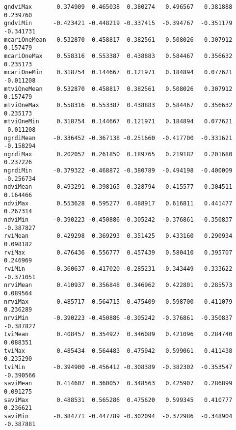 \documentclass[11pt]{article}
\begin{document}
\begin{Verbatim}[commandchars=\\\{\}]
gndviMax       0.374909  0.465038  0.380274   0.496567   0.381888  0.239760
gndviMin      -0.423421 -0.448219 -0.337415  -0.394767  -0.351179 -0.341731
mcariOneMean   0.532870  0.458817  0.382561   0.508026   0.307912  0.157479
mcariOneMax    0.558316  0.553387  0.438883   0.584467   0.356632  0.235173
mcariOneMin    0.318754  0.144667  0.121971   0.184894   0.077621 -0.011208
mtviOneMean    0.532870  0.458817  0.382561   0.508026   0.307912  0.157479
mtviOneMax     0.558316  0.553387  0.438883   0.584467   0.356632  0.235173
mtviOneMin     0.318754  0.144667  0.121971   0.184894   0.077621 -0.011208
ngrdiMean     -0.336452 -0.367138 -0.251660  -0.417700  -0.331621 -0.158294
ngrdiMax       0.202052  0.261850  0.189765   0.219182   0.201680  0.237226
ngrdiMin      -0.379322 -0.468872 -0.380789  -0.494198  -0.400009 -0.256734
ndviMean       0.493291  0.398165  0.328794   0.415577   0.304511  0.164466
ndviMax        0.553628  0.595277  0.488917   0.616811   0.441477  0.267314
ndviMin       -0.390223 -0.450886 -0.305242  -0.376861  -0.350837 -0.387827
rviMean        0.429298  0.369293  0.351425   0.433160   0.290934  0.098182
rviMax         0.476436  0.556777  0.457439   0.580410   0.395707  0.246969
rviMin        -0.360637 -0.417020 -0.285231  -0.343449  -0.333622 -0.371051
nrviMean       0.410937  0.356848  0.346962   0.422801   0.285573  0.089564
nrviMax        0.485717  0.564715  0.475409   0.598700   0.411079  0.236289
nrviMin       -0.390223 -0.450886 -0.305242  -0.376861  -0.350837 -0.387827
tviMean        0.408457  0.354927  0.346089   0.421096   0.284740  0.088351
tviMax         0.485434  0.564483  0.475942   0.599061   0.411438  0.235290
tviMin        -0.394900 -0.456412 -0.308389  -0.382302  -0.353547 -0.390566
saviMean       0.414607  0.360057  0.348563   0.425907   0.286899  0.091275
saviMax        0.488531  0.565286  0.475620   0.599345   0.410777  0.236621
saviMin       -0.384771 -0.447789 -0.302094  -0.372986  -0.348904 -0.387881


\end{Verbatim}
\end{document}

